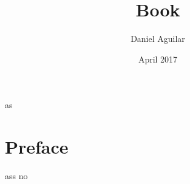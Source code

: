 
\title{Book}
\newpage
\author{Daniel Aguilar}
\date{April 2017}
\makeindex

\frontmatter
\begin{titlepage}
\end{titlepage}
\null
\pagestyle{empty} %

\begin{asds}
    as
\end{asds}

\maketitle
\tableofcontents

\mainmatter


\chapter{Preface}
ass  no
\cleardoublepage
\printindex
